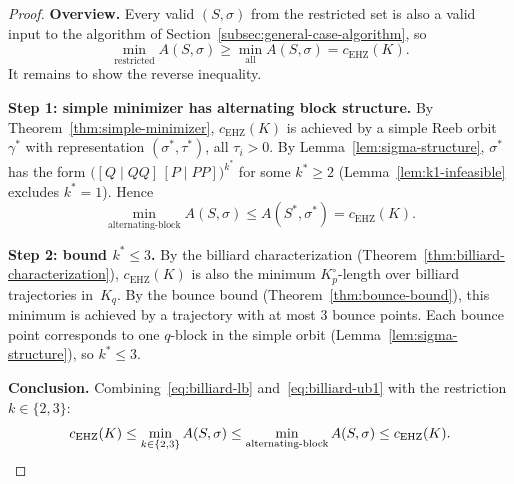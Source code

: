 \begin{proof}
\textbf{Overview.}\quad
Every valid $(S, \sigma)$ from the restricted set is also a valid
input to the algorithm of Section~\ref{subsec:general-case-algorithm}, so
\begin{equation}\label{eq:billiard-lb}
  \min_{\text{restricted}} A(S, \sigma)
  \geq \min_{\text{all}} A(S, \sigma)
  = c_{\mathrm{EHZ}}(K).
\end{equation}
It remains to show the reverse inequality.

\medskip\noindent
\textbf{Step 1: simple minimizer has alternating block structure.}\quad
By Theorem~\ref{thm:simple-minimizer}, $c_{\mathrm{EHZ}}(K)$ is
achieved by a simple Reeb orbit $\gamma^*$ with representation
$(\sigma^*, \tau^*)$, all $\tau_i > 0$.
By Lemma~\ref{lem:sigma-structure}, $\sigma^*$ has the form
$\bigl([Q \mid QQ]\,[P \mid PP]\bigr)^{k^*}$ for some $k^* \geq 2$
(Lemma~\ref{lem:k1-infeasible} excludes $k^* = 1$).
Hence
\begin{equation}\label{eq:billiard-ub1}
  \min_{\text{alternating-block}} A(S, \sigma) \leq A(S^*, \sigma^*)
  = c_{\mathrm{EHZ}}(K).
\end{equation}

\medskip\noindent
\textbf{Step 2: bound $k^* \leq 3$.}\quad
By the billiard characterization
(Theorem~\ref{thm:billiard-characterization}), $c_{\mathrm{EHZ}}(K)$
is also the minimum $K_p^\circ$-length over billiard trajectories
in~$K_q$. By the bounce bound (Theorem~\ref{thm:bounce-bound}),
this minimum is achieved by a trajectory with at most $3$ bounce points.
Each bounce point corresponds to one $q$-block in the simple orbit
(Lemma~\ref{lem:sigma-structure}), so $k^* \leq 3$.

\medskip\noindent
\textbf{Conclusion.}\quad
Combining~\eqref{eq:billiard-lb} and~\eqref{eq:billiard-ub1}
with the restriction $k \in \{2, 3\}$:
\[
  c_{\mathrm{EHZ}}(K)
  \leq \min_{k \in \{2,3\}} A(S, \sigma)
  \leq \min_{\text{alternating-block}} A(S, \sigma)
  \leq c_{\mathrm{EHZ}}(K). \qedhere
\]
\end{proof}

